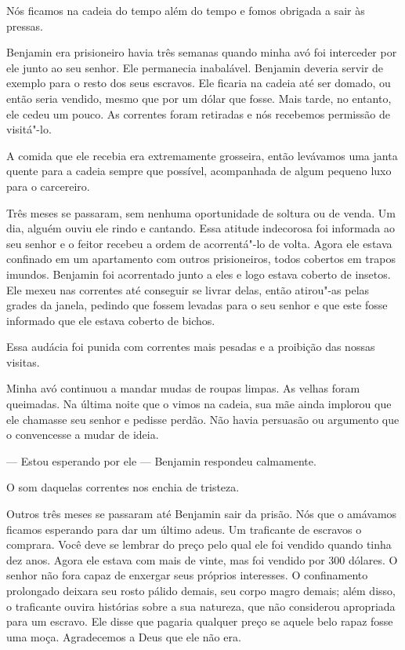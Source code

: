 Nós ficamos na cadeia do tempo além do
tempo e fomos obrigada a sair às pressas.

Benjamin era prisioneiro havia três
semanas quando minha avó foi interceder por ele junto ao seu senhor. Ele
permanecia inabalável. Benjamin deveria servir de exemplo para o resto
dos seus escravos. Ele ficaria na cadeia até ser domado, ou então seria
vendido, mesmo que por um dólar que fosse. Mais tarde, no entanto, ele
cedeu um pouco. As correntes foram retiradas e nós recebemos permissão
de visitá"-lo.

A comida que ele recebia era
extremamente grosseira, então levávamos uma janta quente para a cadeia
sempre que possível, acompanhada de algum pequeno luxo para o
carcereiro.

Três meses se passaram, sem nenhuma
oportunidade de soltura ou de venda. Um dia, alguém ouviu ele rindo e
cantando. Essa atitude indecorosa foi informada ao seu senhor e o feitor
recebeu a ordem de acorrentá"-lo de volta. Agora ele estava confinado em
um apartamento com outros prisioneiros, todos cobertos em trapos
imundos. Benjamin foi acorrentado junto a eles e logo estava coberto de
insetos. Ele mexeu nas correntes até conseguir se livrar delas, então
atirou"-as pelas grades da janela, pedindo que fossem levadas para o seu
senhor e que este fosse informado que ele estava coberto de bichos.

Essa audácia foi punida com correntes
mais pesadas e a proibição das nossas visitas.

Minha avó continuou a mandar mudas de
roupas limpas. As velhas foram queimadas. Na última noite que o vimos na
cadeia, sua mãe ainda implorou que ele chamasse seu senhor e pedisse
perdão. Não havia persuasão ou argumento que o convencesse a mudar de
ideia.

--- Estou esperando por ele --- Benjamin respondeu calmamente.

O som daquelas correntes nos enchia de
tristeza.

Outros três meses se passaram até
Benjamin sair da prisão. Nós que o amávamos ficamos esperando para dar
um último adeus. Um traficante de escravos o comprara. Você deve se
lembrar do preço pelo qual ele foi vendido quando tinha dez anos. Agora
ele estava com mais de vinte, mas foi vendido por 300 dólares. O senhor
não fora capaz de enxergar seus próprios interesses. O confinamento
prolongado deixara seu rosto pálido demais, seu corpo magro demais; além
disso, o traficante ouvira histórias sobre a sua natureza, que não
considerou apropriada para um escravo. Ele disse que pagaria qualquer
preço se aquele belo rapaz fosse uma moça. Agradecemos a Deus que ele
não era.

